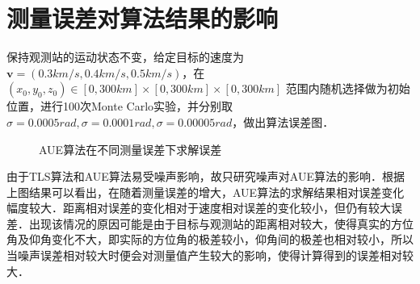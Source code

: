 \section{测量误差对算法结果的影响}
保持观测站的运动状态不变，给定目标的速度为 $\bm{v} = (0.3km/s,0.4km/s,0.5km/s)$，在 $(x_0,y_0,z_0) \in [0,300km]\times[0,300km]\times[0,300km]$ 范围内随机选择做为初始位置，进行100次Monte Carlo实验，并分别取$\sigma=0.0005rad,\sigma=0.0001rad,\sigma=0.00005rad$，做出算法误差图．
\begin{figure}[htbp]
	\centering

	\caption{AUE算法在不同测量误差下求解误差}
\end{figure}

由于TLS算法和AUE算法易受噪声影响，故只研究噪声对AUE算法的影响．根据上图结果可以看出，在随着测量误差的增大，AUE算法的求解结果相对误差变化幅度较大．距离相对误差的变化相对于速度相对误差的变化较小，但仍有较大误差．出现该情况的原因可能是由于目标与观测站的距离相对较大，使得真实的方位角及仰角变化不大，即实际的方位角的极差较小，仰角间的极差也相对较小，所以当噪声误差相对较大时便会对测量值产生较大的影响，使得计算得到的误差相对较大．
